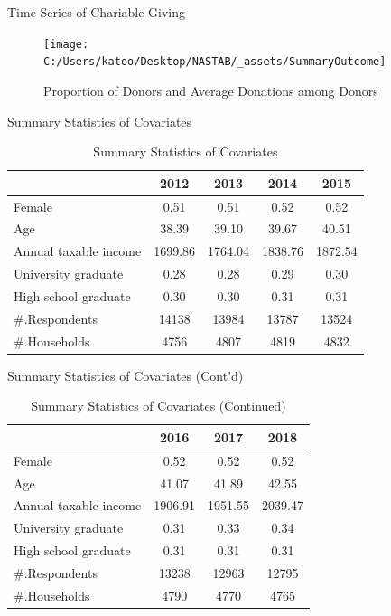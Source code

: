 \documentclass[
  ignorenonframetext,
]{beamer}
\begin{document}
\begin{frame}{Time Series of Chariable Giving}
\protect\hypertarget{time-series-of-chariable-giving}{}
\begin{figure}
\texttt{[image: C:/Users/katoo/Desktop/NASTAB/\_assets/SummaryOutcome]} \caption{Proportion of Donors and Average Donations among Donors}\label{fig:unnamed-chunk-1}
\end{figure}
\end{frame}

\begin{frame}{Summary Statistics of Covariates}
\protect\hypertarget{summary-statistics-of-covariates}{}
\begin{table}

\caption{\label{tab:kableSummaryCovariate}Summary Statistics of Covariates}
\centering
\begin{tabular}[t]{lcccc}
\toprule
 & 2012 & 2013 & 2014 & 2015\\
\midrule
Female & 0.51 & 0.51 & 0.52 & 0.52\\
Age & 38.39 & 39.10 & 39.67 & 40.51\\
Annual taxable income & 1699.86 & 1764.04 & 1838.76 & 1872.54\\
University graduate & 0.28 & 0.28 & 0.29 & 0.30\\
High school graduate & 0.30 & 0.30 & 0.31 & 0.31\\
\#.Respondents & 14138 & 13984 & 13787 & 13524\\
\#.Households & 4756 & 4807 & 4819 & 4832\\
\bottomrule
\end{tabular}
\end{table}
\end{frame}

\begin{frame}{Summary Statistics of Covariates (Cont'd)}
\protect\hypertarget{summary-statistics-of-covariates-contd}{}
\begin{table}

\caption{\label{tab:kableSummaryCovariate2}Summary Statistics of Covariates (Continued)}
\centering
\begin{tabular}[t]{lccc}
\toprule
 & 2016 & 2017 & 2018\\
\midrule
Female & 0.52 & 0.52 & 0.52\\
Age & 41.07 & 41.89 & 42.55\\
Annual taxable income & 1906.91 & 1951.55 & 2039.47\\
University graduate & 0.31 & 0.33 & 0.34\\
High school graduate & 0.31 & 0.31 & 0.31\\
\#.Respondents & 13238 & 12963 & 12795\\
\#.Households & 4790 & 4770 & 4765\\
\bottomrule
\end{tabular}
\end{table}
\end{frame}
\end{document}
